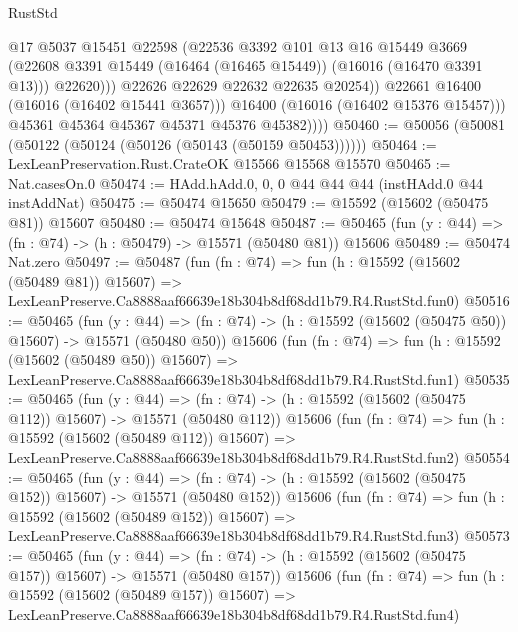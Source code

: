 \begin{lexlean}{RustStd}
\begin{coremodule}
                        @17
                        @5037
                        @15451
                        @22598
                        (@22536
                          @3392
                          @101
                          @13
                          @16
                          @15449
                          @3669
                          (@22608 @3391 @15449 (@16464 (@16465 @15449)) (@16016 (@16470 @3391 @13)))
                          @22620)))
                    @22626
                    @22629
                    @22632
                    @22635
                    @20254))
                @22661
                @16400
                (@16016 (@16402 @15441 @3657)))
              @16400
              (@16016 (@16402 @15376 @15457)))
            @45361
            @45364
            @45367
            @45371
            @45376
            @45382))))
@50460 := @50056 (@50081 (@50122 (@50124 (@50126 (@50143 (@50159 @50453))))))
@50464 := LexLeanPreservation.Rust.CrateOK @15566 @15568 @15570
@50465 := Nat.casesOn.{0}
@50474 := HAdd.hAdd.{0, 0, 0} @44 @44 @44 (instHAdd.{0} @44 instAddNat)
@50475 := @50474 @15650
@50479 := @15592 (@15602 (@50475 @81)) @15607
@50480 := @50474 @15648
@50487 := @50465 (fun (y : @44) => (fn : @74) -> (h : @50479) -> @15571 (@50480 @81)) @15606
@50489 := @50474 Nat.zero
@50497 := @50487
    (fun (fn : @74) =>
    fun (h : @15592 (@15602 (@50489 @81)) @15607) =>
    LexLeanPreserve.Ca8888aaf66639e18b304b8df68dd1b79.R4.RustStd.fun0)
@50516 := @50465
    (fun (y : @44) =>
    (fn : @74) -> (h : @15592 (@15602 (@50475 @50)) @15607) -> @15571 (@50480 @50))
    @15606
    (fun (fn : @74) =>
    fun (h : @15592 (@15602 (@50489 @50)) @15607) =>
    LexLeanPreserve.Ca8888aaf66639e18b304b8df68dd1b79.R4.RustStd.fun1)
@50535 := @50465
    (fun (y : @44) =>
    (fn : @74) -> (h : @15592 (@15602 (@50475 @112)) @15607) -> @15571 (@50480 @112))
    @15606
    (fun (fn : @74) =>
    fun (h : @15592 (@15602 (@50489 @112)) @15607) =>
    LexLeanPreserve.Ca8888aaf66639e18b304b8df68dd1b79.R4.RustStd.fun2)
@50554 := @50465
    (fun (y : @44) =>
    (fn : @74) -> (h : @15592 (@15602 (@50475 @152)) @15607) -> @15571 (@50480 @152))
    @15606
    (fun (fn : @74) =>
    fun (h : @15592 (@15602 (@50489 @152)) @15607) =>
    LexLeanPreserve.Ca8888aaf66639e18b304b8df68dd1b79.R4.RustStd.fun3)
@50573 := @50465
    (fun (y : @44) =>
    (fn : @74) -> (h : @15592 (@15602 (@50475 @157)) @15607) -> @15571 (@50480 @157))
    @15606
    (fun (fn : @74) =>
    fun (h : @15592 (@15602 (@50489 @157)) @15607) =>
    LexLeanPreserve.Ca8888aaf66639e18b304b8df68dd1b79.R4.RustStd.fun4)

\end{coremodule}
\end{lexlean}
